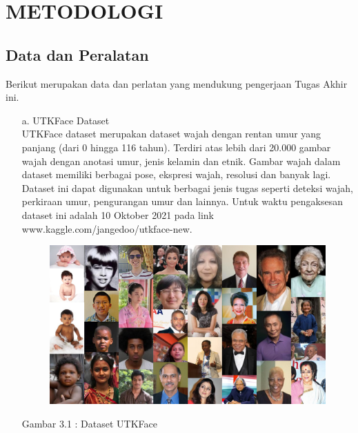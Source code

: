 \section{METODOLOGI}


\subsection{Data dan Peralatan}

Berikut merupakan data dan perlatan yang mendukung pengerjaan Tugas Akhir ini.
\begin{itemize}
   \item [a.] UTKFace Dataset \\
   UTKFace dataset  merupakan dataset wajah dengan rentan umur yang panjang (dari 0 hingga 116 tahun). 
   Terdiri atas lebih dari 20.000 gambar wajah dengan anotasi umur, jenis kelamin dan etnik. Gambar wajah
   dalam dataset memiliki berbagai pose, ekspresi wajah, resolusi dan banyak lagi. Dataset ini dapat 
   digunakan untuk berbagai jenis tugas seperti deteksi wajah, perkiraan umur, pengurangan umur dan 
   lainnya\citep{UTKFace}. Untuk waktu pengaksesan dataset ini adalah 10 Oktober 2021 pada link 
   www.kaggle.com/jangedoo/utkface-new.
    \begin{figure} [H] \centering
      \includegraphics[scale=0.2]{gambar/UTKFace.png}
      \label{fig:UTKFace}
    \end{figure}

    \begin{center}
      Gambar 3.1 : Dataset UTKFace
    \end{center}


\end{itemize}
